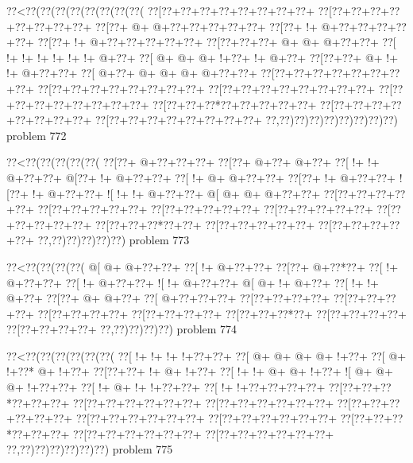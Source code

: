 \vbox{\vbox{\goo
\0??<\0??(\0??(\0??(\0??(\0??(\0??(\0??(\0??(
\0??[\0??+\0??+\0??+\0??+\0??+\0??+\0??+\0??+
\0??[\0??+\0??+\0??+\0??+\0??+\0??+\0??+\0??+
\0??[\0??+\- @+\- @+\0??+\0??+\0??+\0??+\0??+
\0??[\0??+\- !+\- @+\0??+\0??+\0??+\0??+\0??+
\0??[\0??+\- !+\- @+\0??+\0??+\0??+\0??+\0??+
\0??[\0??+\0??+\0??+\- @+\- @+\- @+\0??+\0??+
\0??[\- !+\- !+\- !+\- !+\- !+\- !+\- @+\0??+
\0??[\- @+\- @+\- @+\- !+\0??+\- !+\- @+\0??+
\0??[\0??+\0??+\- @+\- !+\- !+\- @+\0??+\0??+
\0??[\- @+\0??+\- @+\- @+\- @+\- @+\0??+\0??+
\0??[\0??+\0??+\0??+\0??+\0??+\0??+\0??+\0??+
\0??[\0??+\0??+\0??+\0??+\0??+\0??+\0??+\0??+
\0??[\0??+\0??+\0??+\0??+\0??+\0??+\0??+\0??+
\0??[\0??+\0??+\0??+\0??+\0??+\0??+\0??+\0??+
\0??[\0??+\0??+\0??*\0??+\0??+\0??+\0??+\0??+
\0??[\0??+\0??+\0??+\0??+\0??+\0??+\0??+\0??+
\0??[\0??+\0??+\0??+\0??+\0??+\0??+\0??+\0??+
\0??,\0??)\0??)\0??)\0??)\0??)\0??)\0??)\0??)
}
\hfil problem 772\hfil\break
}

\vbox{\vbox{\goo
\0??<\0??(\0??(\0??(\0??(\0??(
\0??[\0??+\- @+\0??+\0??+\0??+
\0??[\0??+\- @+\0??+\- @+\0??+
\0??[\- !+\- !+\- @+\0??+\0??+
\- @[\0??+\- !+\- @+\0??+\0??+
\0??[\- !+\- @+\- @+\0??+\0??+
\0??[\0??+\- !+\- @+\0??+\0??+
\- ![\0??+\- !+\- @+\0??+\0??+
\- ![\- !+\- !+\- @+\0??+\0??+
\- @[\- @+\- @+\- @+\0??+\0??+
\0??[\0??+\0??+\0??+\0??+\0??+
\0??[\0??+\0??+\0??+\0??+\0??+
\0??[\0??+\0??+\0??+\0??+\0??+
\0??[\0??+\0??+\0??+\0??+\0??+
\0??[\0??+\0??+\0??+\0??+\0??+
\0??[\0??+\0??+\0??*\0??+\0??+
\0??[\0??+\0??+\0??+\0??+\0??+
\0??[\0??+\0??+\0??+\0??+\0??+
\0??,\0??)\0??)\0??)\0??)\0??)
}
\hfil problem 773\hfil\break
}

\vbox{\vbox{\goo
\0??<\0??(\0??(\0??(\0??(
\- @[\- @+\- @+\0??+\0??+
\0??[\- !+\- @+\0??+\0??+
\0??[\0??+\- @+\0??*\0??+
\0??[\- !+\- @+\0??+\0??+
\0??[\- !+\- @+\0??+\0??+
\- ![\- !+\- @+\0??+\0??+
\- @[\- @+\- !+\- @+\0??+
\0??[\- !+\- !+\- @+\0??+
\0??[\0??+\- @+\- @+\0??+
\0??[\- @+\0??+\0??+\0??+
\0??[\0??+\0??+\0??+\0??+
\0??[\0??+\0??+\0??+\0??+
\0??[\0??+\0??+\0??+\0??+
\0??[\0??+\0??+\0??+\0??+
\0??[\0??+\0??+\0??*\0??+
\0??[\0??+\0??+\0??+\0??+
\0??[\0??+\0??+\0??+\0??+
\0??,\0??)\0??)\0??)\0??)
}
\hfil problem 774\hfil\break
}

\vbox{\vbox{\goo
\0??<\0??(\0??(\0??(\0??(\0??(\0??(
\0??[\- !+\- !+\- !+\- !+\0??+\0??+
\0??[\- @+\- @+\- @+\- @+\- !+\0??+
\0??[\- @+\- !+\0??*\- @+\- !+\0??+
\0??[\0??+\0??+\- !+\- @+\- !+\0??+
\0??[\- !+\- !+\- @+\- @+\- !+\0??+
\- ![\- @+\- @+\- @+\- !+\0??+\0??+
\0??[\- !+\- @+\- !+\- !+\0??+\0??+
\0??[\- !+\- !+\0??+\0??+\0??+\0??+
\0??[\0??+\0??+\0??*\0??+\0??+\0??+
\0??[\0??+\0??+\0??+\0??+\0??+\0??+
\0??[\0??+\0??+\0??+\0??+\0??+\0??+
\0??[\0??+\0??+\0??+\0??+\0??+\0??+
\0??[\0??+\0??+\0??+\0??+\0??+\0??+
\0??[\0??+\0??+\0??+\0??+\0??+\0??+
\0??[\0??+\0??+\0??*\0??+\0??+\0??+
\0??[\0??+\0??+\0??+\0??+\0??+\0??+
\0??[\0??+\0??+\0??+\0??+\0??+\0??+
\0??,\0??)\0??)\0??)\0??)\0??)\0??)
}
\hfil problem 775\hfil\break
}

